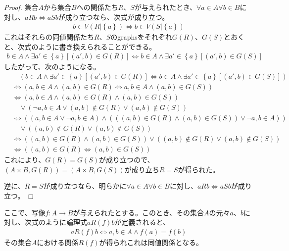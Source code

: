 \documentclass[dvipdfmx]{jsarticle}
\begin{document}
\begin{proof}
集合$A$から集合$B$への関係たち$R$、$S$が与えられたとき、$\forall a \in A\forall b \in B$に対し、$aRb \Leftrightarrow aSb$が成り立つなら、次式が成り立つ。
\begin{align*}
b \in V\left( R|\left\{ a \right\} \right) \Leftrightarrow b \in V\left( S|\left\{ a \right\} \right)
\end{align*}
これはそれらの同値関係たち$R$、$S$のgraphsをそれぞれ$G(R)$、$G(S)$とおくと、次式のように書き換えられることができる。
\begin{align*}
b \in A \land \exists a' \in \left\{ a \right\}\left[ \left( a',b \right) \in G(R) \right] \Leftrightarrow b \in A \land \exists a' \in \left\{ a \right\}\left[ \left( a',b \right) \in G(S) \right]
\end{align*}
したがって、次のようになる。
\begin{align*}
&\quad \left( b \in A \land \exists a' \in \left\{ a \right\}\left[ \left( a',b \right) \in G(R) \right] \Leftrightarrow b \in A \land \exists a' \in \left\{ a \right\}\left[ \left( a',b \right) \in G(S) \right] \right)\\
&\Leftrightarrow \left( a,b \in A \land (a,b) \in G(R) \Leftrightarrow a,b \in A \land (a,b) \in G(S) \right)\\
&\Leftrightarrow \left( a,b \in A \land (a,b) \in G(R) \land (a,b) \in G(S) \right) \\
&\quad \vee \left( \neg a,b \in A \vee (a,b) \notin G(R) \vee (a,b) \notin G(S) \right)\\
&\Leftrightarrow \left( (a,b \in A \vee \neg a,b \in A) \land \left( \left( (a,b) \in G(R) \land (a,b) \in G(S) \right) \vee \neg a,b \in A \right) \right) \\
&\quad \vee \left( (a,b) \notin G(R) \vee (a,b) \notin G(S) \right)\\
&\Leftrightarrow \left( (a,b) \in G(R) \land (a,b) \in G(S) \right) \vee \left( (a,b) \notin G(R) \vee (a,b) \notin G(S) \right)\\
&\Leftrightarrow \left( (a,b) \in G(R) \Leftrightarrow (a,b) \in G(S) \right)
\end{align*}
これにより、$G(R) = G(S)$が成り立つので、$\left( A \times B,G(R) \right) = \left( A \times B,G(S) \right)$が成り立ち$R = S$が得られた。\par
逆に、$R = S$が成り立つなら、明らかに$\forall a \in A\forall b \in B$に対し、$aRb \Leftrightarrow aSb$が成り立つ。
\end{proof}
\begin{thm}\label{1.2.5.7}
ここで、写像$f:A \rightarrow B$が与えられたとする。このとき、その集合$A$の元々$a$、$b$に対し、次式のように論理式$aR(f)b$が定義されると、
\begin{align*}
aR(f)b \Leftrightarrow a,b \in A \land f(a) = f(b)
\end{align*}
その集合$A$における関係$R(f)$が得られこれは同値関係となる。
\end{thm}
\end{document}
